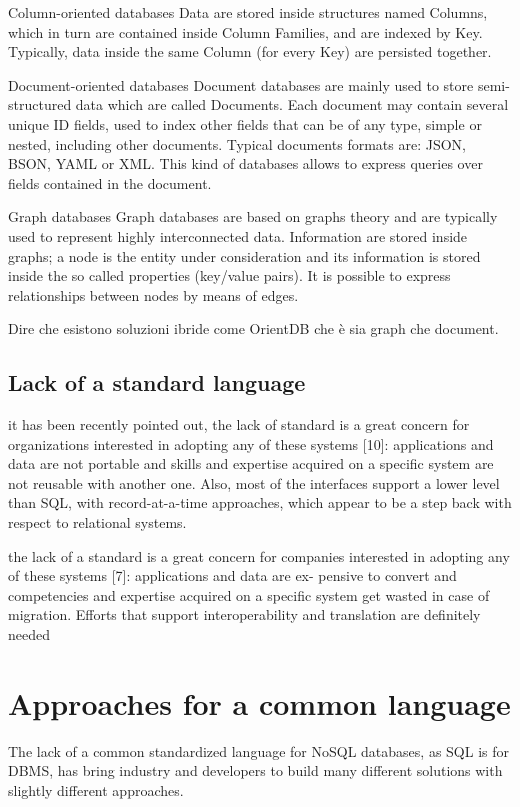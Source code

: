 Column-oriented databases  Data are stored inside structures named Columns, which in turn are contained inside Column Families, and are indexed by Key. Typically, data inside the same Column (for every Key) are persisted together.

Document-oriented databases Document databases are mainly used to store semi-structured data which are called Documents. Each document may contain several unique ID fields, used to index other fields that can be of any type, simple or nested, including other documents. Typical documents formats are: JSON, BSON, YAML or XML.
This kind of databases allows to express queries over fields contained in the document.

Graph databases Graph databases are based on graphs theory and are typically used to represent highly interconnected data. Information are stored inside graphs; a node is the entity under consideration and its information is stored inside the so called properties (key/value pairs). It is possible to express relationships between nodes by means of edges.

Dire che esistono soluzioni ibride come OrientDB che è sia graph che document.

\subsection{Lack of a standard language}
it has been recently pointed out, the lack of standard is a great concern for organizations interested in adopting any of these systems [10]: applications and data are not portable and skills and expertise acquired on a specific system are not reusable with another one. Also, most of the interfaces support a lower level than SQL, with record-at-a-time approaches, which appear to be a step back with respect to relational systems.

the lack of a standard is a great concern for companies interested in adopting any of these systems [7]: applications and data are ex- pensive to convert and competencies and expertise acquired on a specific system get wasted in case of migration. Efforts that support interoperability and translation are definitely needed


\section{Approaches for a common language}
\label{sec:common-language}
The lack of a common standardized language for NoSQL databases, as SQL is for DBMS, has bring industry and developers to build many different solutions with slightly different approaches.


